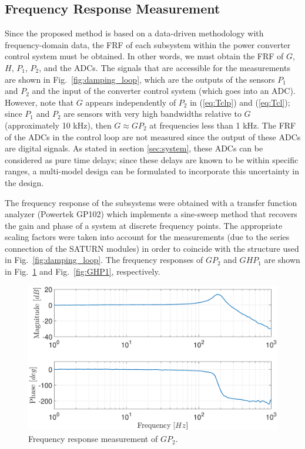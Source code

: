 \documentclass[a4paper, 10pt, conference]{ieeeconf}
\begin{document}
\subsection{Frequency Response Measurement}
Since the proposed method is based on a data-driven methodology with frequency-domain data, the FRF of each subsystem within the power converter control system must be obtained. In other words, we must obtain the FRF of $G$, $H$, $P_1$, $P_2$, and the ADCs. The signals that are accessible for the measurements are shown in Fig.~\ref{fig:damping_loop}, which are the outputs of the sensors $P_1$ and $P_2$ and the input of the converter control system (which goes into an ADC). However, note that $G$ appears independently of $P_2$ in (\ref{eq:Tclp}) and (\ref{eq:Tcl}); since $P_1$ and $P_2$ are sensors with very high bandwidths relative to $G$ (approximately 10 kHz), then $G \approx GP_2$  at frequencies less than 1 kHz. The FRF of the ADCs in the control loop are not measured since the output of these ADCs are digital signals. As stated in section \ref{sec:system}, these ADCs can be considered as pure time delays; since these delays are known to be within specific ranges, a multi-model design can be formulated to incorporate this uncertainty in the design. 

The frequency response of the subsystems were obtained with a transfer function analyzer (Powertek GP102) which implements a sine-sweep method that recovers the gain and phase of a system at discrete frequency points. The appropriate scaling factors were taken into account for the measurements (due to the series connection of the SATURN modules) in order to coincide with the structure used in Fig.~\ref{fig:damping_loop}. The frequency responses of $GP_2$ and $GHP_1$ are shown in Fig.~\ref{fig:G} and Fig.~\ref{fig:GHP1}, respectively.

\begin{figure}
\centering
\includegraphics[width=\columnwidth]{../pics/G.eps}
\caption{Frequency response measurement of $GP_2$.}
\label{fig:G}
\end{figure} 
\end{document}
